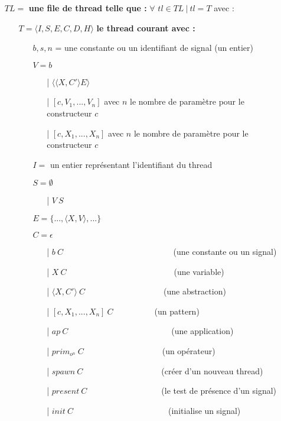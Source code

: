 \documentclass[10pt,a4paper]{report}
\begin{document}
	\begin{itemize}
		\item[] $TL =$ \textbf{une file de thread telle que :} $\forall$ $tl \in TL~|~tl = T$ avec :
		\begin{itemize}
			\item[] $T = \langle I,S,E,C,D,H\rangle$ \textbf{le thread courant avec :}
			\begin{itemize}
				\item[] $b,s,n$ = une constante ou un identifiant de signal (un entier)
				\item[] $V = b$	
				\begin{itemize}
					\item[|] $\langle\langle X,C' \rangle E\rangle$
					\item[|] $[c,V_{1},...,V_{n}]$ avec $n$ le nombre de paramètre pour le constructeur $c$
					\item[|] $[c,X_{1},...,X_{n}]$ avec $n$ le nombre de paramètre pour le constructeur $c$
				\end{itemize}
				\item[] $I =$ un entier représentant l'identifiant du thread
				\item[] $S =  \emptyset$ 
				\begin{itemize}
					\item[|] $V~S$
				\end{itemize}
				\item[] $E = \{...,\langle X,V\rangle,...\}$
				\item[] $C = \epsilon$
				\begin{itemize}
					\item[|] $b~C$~~~~~~~~~~~~~~~~~~~~~~~~~~ (une constante ou un signal)
					\item[|] $X~C$~~~~~~~~~~~~~~~~~~~~~~~~~~(une variable)
					\item[|] $\langle X,C'\rangle~C$~~~~~~~~~~~~~~~~~~~(une abstraction)
					\item[|] $[c,X_{1},...,X_{n}]~C$~~~~~~~~~~(un pattern)
					\item[|] $ap~C$~~~~~~~~~~~~~~~~~~~~~~~~~(une application)
					\item[|] $prim_{o^{n}}~C$~~~~~~~~~~~~~~~~~~~(un opérateur)
					\item[|] $spawn~C$~~~~~~~~~~~~~~~~~~~(créer d'un nouveau thread)
					\item[|] $present~C$~~~~~~~~~~~~~~~~~~(le test de présence d'un signal)
					\item[|] $init~C$~~~~~~~~~~~~~~~~~~~~~~~(initialise un signal)

\end{itemize}
\end{itemize}
\end{itemize}
\end{itemize}
\end{document}
